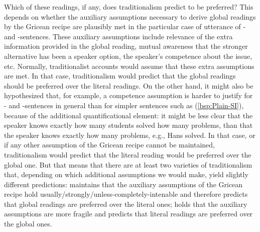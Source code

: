\documentclass[fleqn,reqno,10pt,draft]{article}
\newcommand{\as}{\acro{as}}
\renewcommand{\es}{\acro{es}}
\begin{document}
Which of these readings, if any, does traditionalism predict to be
preferred? This depends on whether the auxiliary assumptions necessary
to derive global readings by the Gricean recipe are plausibly met in
the particular case of utterance of \as- and \es-sentences. These
auxiliary assumptions include relevance of the extra information
provided in the global reading, mutual awareness that the stronger
alternative has been a speaker option, the speaker's competence about
the issue, etc. Normally, traditionalist accounts would assume that
these extra assumptions are met. In that case, traditionalism would
predict that the global readings should be preferred over the literal
readings. On the other hand, it might also be hypothesized that, for
example, a competence assumption is harder to justify for \as- and
\es-sentences in general than for simpler sentences such as
(\ref{bsp:Plain-SI}), because of the additional quantificational
element: it might be less clear that the speaker knows exactly how
many students solved how many problems, than that the speaker knows
exactly how many problems, e.g., Hans solved. In that case, or if any
other assumption of the Gricean recipe cannot be maintained,
traditionalism would predict that the literal reading would be
preferred over the global one. But that means that there are at least
two varieties of traditionalism that, depending on which additional
assumptions we would make, yield slightly different predictions:
 maintains that the
auxiliary assumptions of the Gricean recipe hold
usually/strongly/unless-completely-intenable and therefore predicts
that global readings are preferred over the literal ones;  holds that the auxiliary assumptions
are more fragile and predicts that literal readings are preferred over
the global ones.
\end{document}
